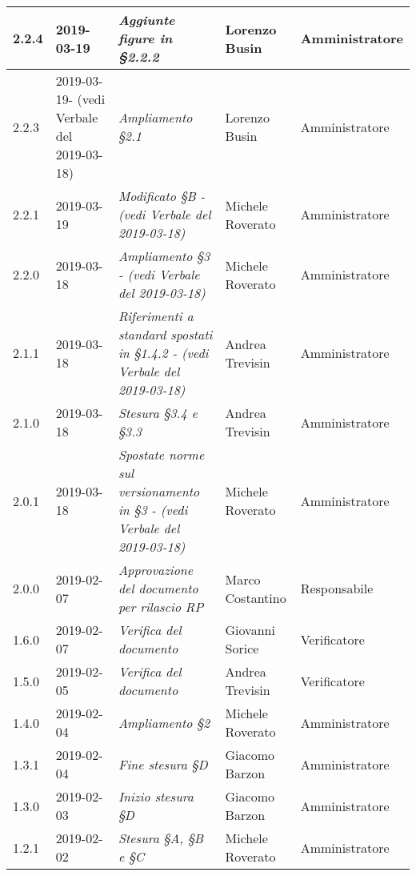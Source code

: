 \begin{longtable}{C{2cm}|C{2.5cm}|C{4.5cm}|C{2.5cm}|C{3cm}}
		2.2.4 & 2019-03-19 & \emph{Aggiunte figure in §2.2.2} & Lorenzo Busin & Amministratore \\
		\hline
		
		2.2.3 & 2019-03-19- (vedi Verbale del 2019-03-18) & \emph{Ampliamento §2.1} & Lorenzo Busin & Amministratore \\
		\hline
		
		2.2.1 & 2019-03-19 & \emph{Modificato §B - (vedi Verbale del 2019-03-18)} & Michele Roverato & Amministratore \\
		\hline
		
		2.2.0 & 2019-03-18 & \emph{Ampliamento §3 - (vedi Verbale del 2019-03-18)} & Michele Roverato & Amministratore \\
		\hline
		
		2.1.1 & 2019-03-18 & \emph{Riferimenti a standard spostati in §1.4.2 - (vedi Verbale del 2019-03-18)} & Andrea Trevisin & Amministratore \\
		\hline
		
		2.1.0 & 2019-03-18 & \emph{Stesura §3.4 e §3.3} & Andrea Trevisin & Amministratore \\
		\hline
		
		2.0.1 & 2019-03-18 & \emph{Spostate norme sul versionamento in §3 - (vedi Verbale del 2019-03-18)} & Michele Roverato & Amministratore \\
		\hline
		
		2.0.0 & 2019-02-07 & \emph{Approvazione del documento per rilascio RP} & Marco Costantino & Responsabile \\
		\hline
		
		1.6.0 & 2019-02-07 & \emph{Verifica del documento}  & Giovanni Sorice & Verificatore  \\
		\hline
		
		1.5.0 & 2019-02-05 & \emph{Verifica del documento} & Andrea Trevisin & Verificatore  \\
		\hline
		
		1.4.0 & 2019-02-04 & \emph{Ampliamento §2} & Michele Roverato & Amministratore  \\
		\hline
		
		 1.3.1 & 2019-02-04 & \emph{Fine stesura §D} & Giacomo Barzon & Amministratore \\
		\hline
		
		1.3.0 & 2019-02-03 & \emph{Inizio stesura §D} & Giacomo Barzon & Amministratore  \\
		\hline
		
		1.2.1 & 2019-02-02 & \emph{Stesura §A, §B e §C} & Michele Roverato & Amministratore  \\
		\hline
		

\end{longtable}
